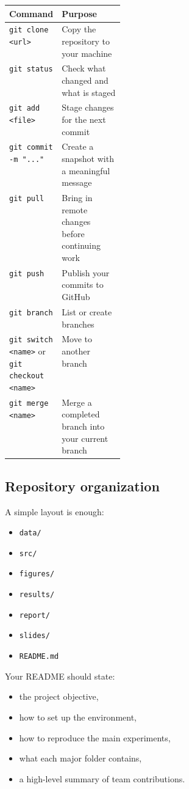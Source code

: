 \documentclass[11pt]{article}
\begin{document}
\begin{tabularx}{\linewidth}{>{\ttfamily\raggedright\arraybackslash}p{0.22\linewidth} >{\raggedright\arraybackslash}X}
\toprule
\textbf{Command} & \textbf{Purpose} \\
\midrule
\verb|git clone <url>| & Copy the repository to your machine \\
\verb|git status| & Check what changed and what is staged \\
\verb|git add <file>| & Stage changes for the next commit \\
\verb|git commit -m "..."| & Create a snapshot with a meaningful message \\
\verb|git pull| & Bring in remote changes before continuing work \\
\verb|git push| & Publish your commits to GitHub \\
\verb|git branch| & List or create branches \\
\verb|git switch <name>| or \verb|git checkout <name>| & Move to another branch \\
\verb|git merge <name>| & Merge a completed branch into your current branch \\
\bottomrule
\end{tabularx}

\subsection{Repository organization}

A simple layout is enough:

\begin{itemize}
    \item \verb|data/|
    \item \verb|src/|
    \item \verb|figures/|
    \item \verb|results/|
    \item \verb|report/|
    \item \verb|slides/|
    \item \verb|README.md|
\end{itemize}

Your README should state:

\begin{itemize}
    \item the project objective,
    \item how to set up the environment,
    \item how to reproduce the main experiments,
    \item what each major folder contains,
    \item a high-level summary of team contributions.
\end{itemize}
\end{document}
